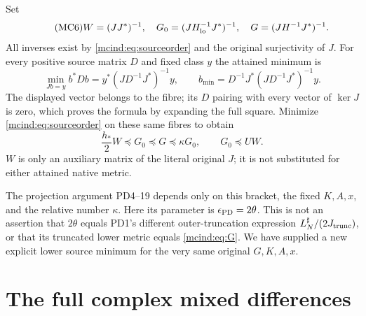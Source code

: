 Set
\begin{equation}\tag{MC6}\label{mcind:eq:G}
 W=(JJ^*)^{-1},\quad
 G_0=(JH_{\rm lo}^{-1}J^*)^{-1},\quad
 G=(JH^{-1}J^*)^{-1}.
\end{equation}
All inverses exist by \eqref{mcind:eq:sourceorder} and the original
surjectivity of $J$. For every positive source matrix $D$ and
fixed class $y$ the attained minimum is
\[
 \min_{Jb=y}b^*Db=y^*(JD^{-1}J^*)^{-1}y,
 \qquad b_{\min}=D^{-1}J^*(JD^{-1}J^*)^{-1}y.
\]
The displayed vector belongs to the fibre; its $D$ pairing with
every vector of $\ker J$ is zero, which proves the formula by
expanding the full square. Minimize \eqref{mcind:eq:sourceorder} on
these same fibres to obtain
\begin{equation}\tag{MC7}\label{mcind:eq:classorder}
 \boxed{\frac{h_*}{2}W\preceq G_0\preceq G\preceq\kappa G_0,
                    \qquad G_0\preceq UW.}
\end{equation}
$W$ is only an auxiliary matrix of the literal original $J$;
it is not substituted for either attained native metric.

The projection argument PD4--19 depends only on this bracket,
the fixed $K,A,x$, and the relative number $\kappa$. Here its
parameter is $\epsilon_{\rm PD}=2\theta$. This is not an
assertion that $2\theta$ equals PD1's different outer-truncation
expression $L_N^\sharp/(2J_{\rm trunc})$, or that its truncated
lower metric equals \eqref{mcind:eq:G}. We have supplied a new explicit
lower source minimum for the very same original $G,K,A,x$.

\section{The full complex mixed differences}

